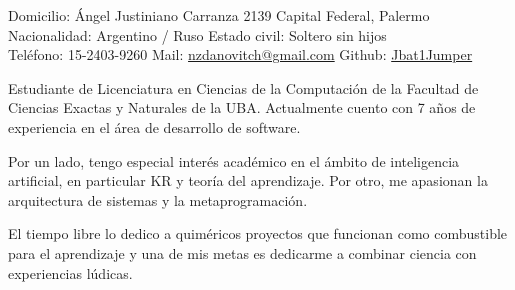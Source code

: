 \documentclass[10pt,a4paper]{article}
\begin{document}
\sloppy



\nobreakvspace{0.3em}

\noindent
Domicilio: Ángel Justiniano Carranza 2139 \sbull
Capital Federal, Palermo \\
Nacionalidad: Argentino / Ruso \sbull
Estado civil: Soltero sin hijos \\
Teléfono: 15-2403-9260 \sbull
Mail: \href{mailto:nzdanovitch.at.gmail.dot.com}{nzdanovitch\mbox{}@\mbox{}gmail.com} \sbull
Github: \href{http://github.com/Jbat1Jumper}{Jbat1Jumper}


\spacedhrule{1.2em}{-0.4em} %





\vspace{-1.3em}
\begin{multicols}{2}
\noindent

Estudiante de Licenciatura en Ciencias de la Computación de la Facultad de
Ciencias Exactas y Naturales de la UBA. Actualmente cuento con 7 años de
experiencia en el área de desarrollo de software.

Por un lado, tengo especial interés académico en el ámbito de inteligencia
artificial, en particular KR y teoría del aprendizaje. Por otro, me apasionan
la arquitectura de sistemas y la metaprogramación.

El tiempo libre lo dedico a quiméricos proyectos que funcionan como
combustible para el aprendizaje y una de mis metas es dedicarme a combinar
ciencia con experiencias lúdicas.


% 

\end{multicols}


\spacedhrule{0.3em}{-0.4em} %



\end{document}
